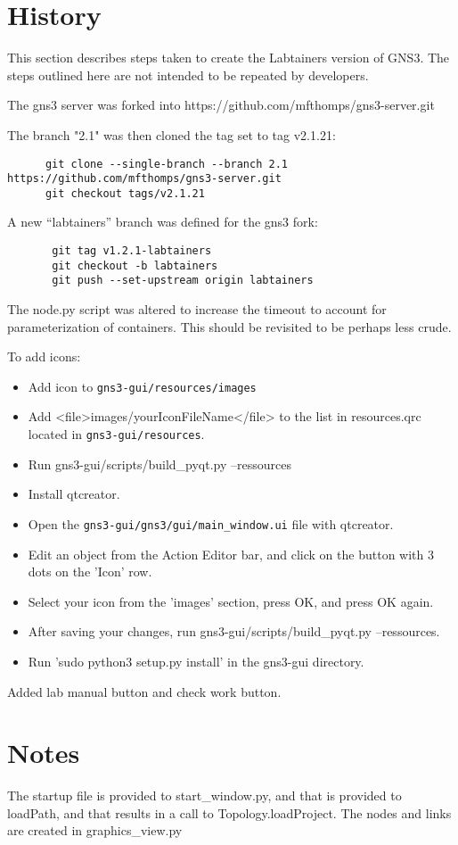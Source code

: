 \documentclass[12pt]{article}
\begin{document}
\section{History}
This section describes steps taken to create the Labtainers version of GNS3.
The steps outlined here are not intended to be repeated by developers.

The gns3 server was forked into https://github.com/mfthomps/gns3-server.git

The branch "2.1" was then cloned the tag set to tag v2.1.21:
\small
\begin{verbatim}
      git clone --single-branch --branch 2.1 https://github.com/mfthomps/gns3-server.git
      git checkout tags/v2.1.21
\end{verbatim}

\normalsize
\noindent A new ``labtainers'' branch was defined for the gns3 fork:
\begin{verbatim}
       git tag v1.2.1-labtainers
       git checkout -b labtainers
       git push --set-upstream origin labtainers
\end{verbatim}

The node.py script was altered to increase the timeout to account for parameterization of
containers.  This should be revisited to be perhaps less crude.

\bigskip
To add icons: 
\begin{itemize}
	\item Add icon to {\tt gns3-gui/resources/images}
	\item Add  <file>images/yourIconFileName</file> to the list in resources.qrc located in {\tt gns3-gui/resources}.
	\item Run gns3-gui/scripts/build\_pyqt.py --ressources
	\item Install qtcreator. 
	\item Open the {\tt gns3-gui/gns3/gui/main\_window.ui} file with qtcreator.
	\item Edit an object from the Action Editor bar, and click on the button with 3 dots on the 'Icon' row. 
	\item Select your icon from the 'images' section, press OK, and press OK again.
	\item After saving your changes, run gns3-gui/scripts/build\_pyqt.py --ressources.
	\item Run 'sudo python3 setup.py install' in the gns3-gui directory.
\end{itemize}
Added lab manual button and check work button.
\section{Notes}
The startup file is provided to start\_window.py, and that is provided to loadPath, and that results in
a call to Topology.loadProject.  The nodes and links are created in graphics\_view.py
\end{document}
